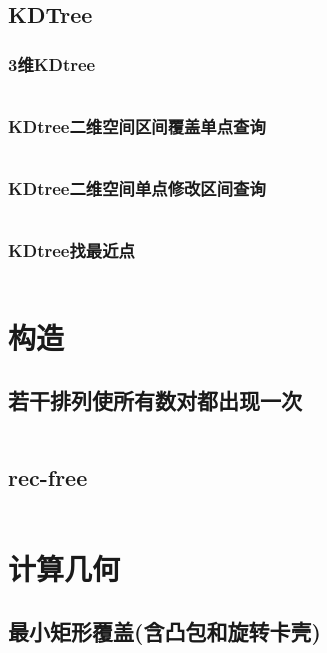 \documentclass[a4paper,11pt]{article}
\begin{document}
\subsection{KDTree}
\subsubsection{3维KDtree}
\inputminted[breaklines]{c++}{数据结构/3维KDtree.cpp}

\subsubsection{KDtree二维空间区间覆盖单点查询}
\inputminted[breaklines]{c++}{数据结构/KDtree二维空间区间覆盖单点查询.cpp}

\subsubsection{KDtree二维空间单点修改区间查询}
\inputminted[breaklines]{c++}{数据结构/KDtree二维空间单点修改区间查询.cpp}

\subsubsection{KDtree找最近点}
\inputminted[breaklines]{c++}{数据结构/KDtree找最近点.cpp}

\twocolumn  %
\newpage
\section{构造}
\subsection{若干排列使所有数对都出现一次}
\inputminted[breaklines]{c++}{构造/若干排列使所有数对都出现一次.cpp}

\subsection{rec-free}
\inputminted[breaklines]{c++}{构造/rec-free.cpp}

\twocolumn  %
\newpage
\section{计算几何}
\subsection{最小矩形覆盖(含凸包和旋转卡壳)}
\inputminted[breaklines]{c++}{计算几何/最小矩形覆盖(含凸包和旋转卡壳).cpp}
\end{document}
